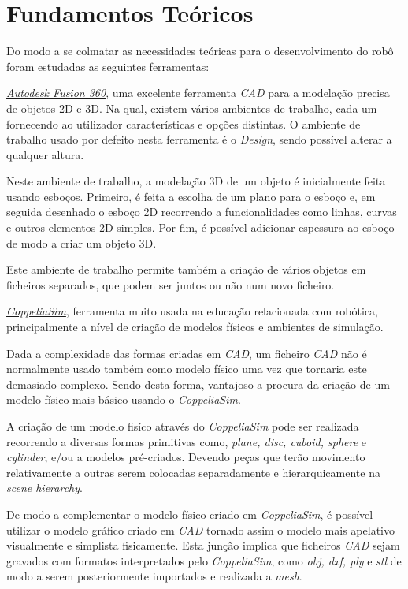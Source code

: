 \chapter{Fundamentos Teóricos}
\label{ch:fund-teor}
%
Do modo a se colmatar as necessidades teóricas para o desenvolvimento do robô foram estudadas as seguintes ferramentas: 

\underline{\textit{Autodesk Fusion 360}}, uma excelente ferramenta \textit{CAD} para a modelação precisa de objetos 2D e 3D. Na qual, existem vários ambientes de trabalho, cada um fornecendo ao utilizador características e opções distintas. O ambiente de trabalho usado por defeito nesta ferramenta é o \textit{Design}, sendo possível alterar a qualquer altura.  

Neste ambiente de trabalho, a modelação 3D de um objeto é inicialmente feita usando esboços. Primeiro, é feita a escolha de um plano para o esboço e, em seguida desenhado o esboço 2D recorrendo a funcionalidades como linhas, curvas e outros elementos 2D simples. Por fim, é possível adicionar espessura ao esboço de modo a criar um objeto 3D. 

Este ambiente de trabalho permite também a criação de vários objetos em ficheiros separados, que podem ser juntos ou não num novo ficheiro. 

\textit{\underline{CoppeliaSim}}, ferramenta muito usada na educação relacionada com robótica, principalmente a nível de criação de modelos físicos e ambientes de simulação. 

Dada a complexidade das formas criadas em \textit{CAD}, um ficheiro \textit{CAD} não é normalmente usado também como modelo físico uma vez que tornaria este demasiado complexo. Sendo desta forma, vantajoso a procura da criação de um modelo físico mais básico usando o \textit{CoppeliaSim}. 

A criação de um modelo fisíco através do \textit{CoppeliaSim} pode ser realizada recorrendo a diversas formas primitivas como, \textit{plane, disc, cuboid, sphere} e \textit{cylinder}, e/ou a modelos pré-criados. Devendo peças que terão movimento relativamente a outras serem colocadas separadamente e hierarquicamente na \textit{scene hierarchy}. 

De modo a complementar o modelo físico criado em \textit{CoppeliaSim}, é possível utilizar o modelo gráfico criado em \textit{CAD} tornado assim o modelo mais apelativo visualmente e simplista fisicamente. Esta junção implica que ficheiros \textit{CAD} sejam gravados com formatos interpretados pelo \textit{CoppeliaSim}, como \textit{obj, dxf, ply} e \textit{stl} de modo a serem posteriormente importados e realizada a \textit{mesh}.  

